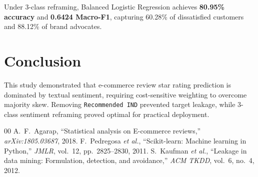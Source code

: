 \documentclass[conference]{IEEEtran}
\begin{document}
Under 3-class reframing, Balanced Logistic Regression achieves \textbf{80.95\% accuracy} and \textbf{0.6424 Macro-F1}, capturing 60.28\% of dissatisfied customers and 88.12\% of brand advocates.

\section{Conclusion}
This study demonstrated that e-commerce review star rating prediction is dominated by textual sentiment, requiring cost-sensitive weighting to overcome majority skew. Removing \texttt{Recommended IND} prevented target leakage, while 3-class sentiment reframing proved optimal for practical deployment.


\begin{thebibliography}{00}
 A.~F.~Agarap, ``Statistical analysis on E-commerce reviews,'' \textit{arXiv:1805.03687}, 2018.
 F.~Pedregosa \textit{et al.}, ``Scikit-learn: Machine learning in Python,'' \textit{JMLR}, vol.~12, pp.~2825--2830, 2011.
 S.~Kaufman \textit{et al.}, ``Leakage in data mining: Formulation, detection, and avoidance,'' \textit{ACM TKDD}, vol.~6, no.~4, 2012.
\end{thebibliography}
\end{document}
